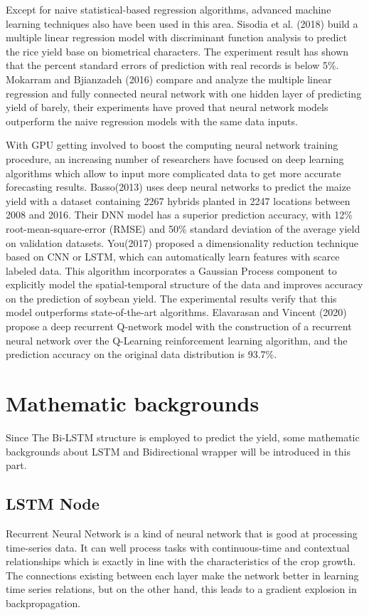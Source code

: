 \documentclass[conference, a4paper]{IEEEtran}
\begin{document}
  Except for naive statistical-based regression algorithms, advanced machine learning techniques also have been used in this area. Sisodia et al. (2018) \cite{sisodiaPreharvestForecastModel2018} build a multiple linear regression model with discriminant function analysis to predict the rice yield base on biometrical characters. The experiment result has shown that the percent standard errors of prediction with real records is below 5\%. Mokarram and Bjianzadeh (2016) \cite{mokarramPredictionBiologicalGrain2016} compare and analyze the multiple linear regression and fully connected neural network with one hidden layer of predicting yield of barely, their experiments have proved that neural network models outperform the naive regression models with the same data inputs. 

  With GPU getting involved to boost the computing neural network training procedure, an increasing number of researchers have focused on deep learning algorithms which allow to input more complicated data to get more accurate forecasting results. Basso(2013)\cite{bassoReviewCropYield2013} uses deep neural networks to predict the maize yield with a dataset containing 2267 hybrids planted in 2247 locations between 2008 and 2016. Their DNN model has a superior prediction accuracy, with 12\% root-mean-square-error (RMSE) and 50\% standard deviation of the average yield on validation datasets. You(2017)\cite{youDeepGaussianProcess2017} proposed a dimensionality reduction technique based on CNN or LSTM, which can automatically learn features with scarce labeled data. This algorithm incorporates a Gaussian Process component to explicitly model the spatial-temporal structure of the data and improves accuracy on the prediction of soybean yield. The experimental results verify that this model outperforms state-of-the-art algorithms. Elavarasan and Vincent (2020) \cite{elavarasanCropYieldPrediction2020} propose a deep recurrent Q-network model with the construction of a recurrent neural network over the Q-Learning reinforcement learning algorithm, and the prediction accuracy on the original data distribution is 93.7\%.


\section{Mathematic backgrounds} \label{sec:MB}
  Since The Bi-LSTM structure is employed to predict the yield, some mathematic backgrounds about LSTM and Bidirectional wrapper will be introduced in this part.
  \subsection{LSTM Node}
    Recurrent Neural Network is a kind of neural network that is good at processing time-series data. It can well process tasks with continuous-time and contextual relationships which is exactly in line with the characteristics of the crop growth. The connections existing between each layer make the network better in learning time series relations, but on the other hand, this leads to a gradient explosion in backpropagation\cite{hochreiterLongShorttermMemory1997}.
\end{document}
